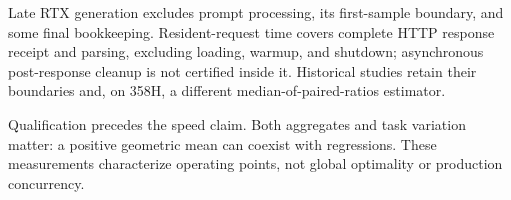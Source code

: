 Late RTX generation excludes prompt processing, its first-sample boundary, and some final bookkeeping. Resident-request time covers complete HTTP response receipt and parsing, excluding loading, warmup, and shutdown; asynchronous post-response cleanup is not certified inside it. Historical studies retain their boundaries and, on 358H, a different median-of-paired-ratios estimator.

Qualification precedes the speed claim. Both aggregates and task variation matter: a positive geometric mean can coexist with regressions. These measurements characterize operating points, not global optimality or production concurrency.

